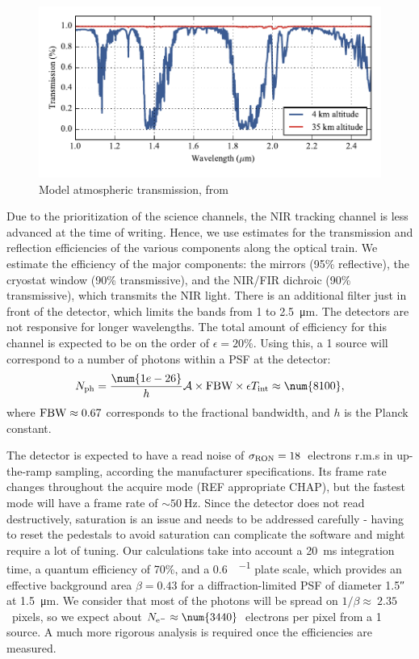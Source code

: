 \begin{figure}[ht!]
\begin{center}
\includegraphics[width=\textwidth]{Figures/BETTII_atmo_transmission.pdf}
\caption{Model atmospheric transmission, from \cite{Rizzo:2012jp}}
\label{fig:trans}
\end{center}
\end{figure}

Due to the prioritization of the science channels, the NIR tracking channel is less advanced at the time of writing. Hence, we use estimates for the transmission and reflection efficiencies of the various components along the optical train. We estimate the efficiency of the major components: the mirrors (95\% reflective), the cryostat window (90\% transmissive), and the NIR/FIR dichroic (90\% transmissive), which transmits the NIR light. There is an additional filter just in front of the detector, which limits the bands from 1 to \SI{2.5}{\micro\meter}. The detectors are not responsive for longer wavelengths. The total amount of efficiency for this channel is expected to be on the order of $\epsilon = 20\%$. Using this, a \SI{1}{\jansky} source will correspond to a number of photons \Nph within a PSF at the detector:
\begin{align}
\Nph = \frac{\num{1e-26}}{h}\Area\times\FBW\times\epsilon\Tint \approx \num{8100},
\end{align}
where $\textrm{FBW} \approx 0.67$ corresponds to the fractional bandwidth, and $h$ is the Planck constant. 

The detector is expected to have a read noise of $\sigma_\textrm{RON} = 18$~electrons r.m.s in up-the-ramp sampling, according the manufacturer specifications. Its frame rate changes throughout the acquire mode (REF appropriate CHAP), but the fastest mode will have a frame rate of $\sim\SI{50}{\hertz}$. Since the detector does not read destructively, saturation is an issue and needs to be addressed carefully - having to reset the pedestals to avoid saturation can complicate the software and might require a lot of tuning. Our calculations take into account a \SI{20}{\milli\second} integration time, a quantum efficiency of 70\%, and a \SI{0.6}{\arcsec\per\pixel} plate scale, which provides an effective background area $\beta = 0.43$ for a diffraction-limited PSF of diameter \ang{;;1.5} at \SI{1.5}{\micro\meter}. We consider that most of the photons will be spread on $1/\beta\approx~2.35$~pixels, so we expect about $\Nel\approx\num{3440}$~electrons per pixel from a \SI{1}{\jansky} source. A much more rigorous analysis is required once the efficiencies are measured.

